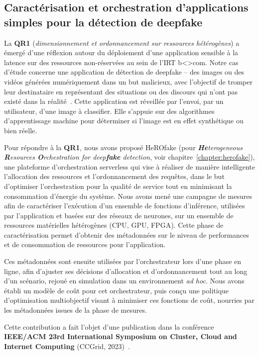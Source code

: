 \subsection{Caractérisation et orchestration d'applications simples pour la détection de deepfake}

La \textbf{QR1} (\textit{dimensionnement et ordonnancement sur ressources hétérogènes}) a émergé d'une réflexion autour du déploiement d'une application sensible à la latence sur des ressources non-réservées au sein de l'IRT b{\textless\textgreater}com. Notre cas d'étude concerne une application de détection de deepfake -- des images ou des vidéos générées numériquement dans un but malicieux, avec l'objectif de tromper leur destinataire en représentant des situations ou des discours qui n'ont pas existé dans la réalité~\cite{westerlundEmergenceDeepfakeTechnology2019}. Cette application est réveillée par l'envoi, par un utilisateur, d'une image à classifier. Elle s'appuie sur des algorithmes d'apprentissage machine pour déterminer si l'image est en effet synthétique ou bien réelle.

\sloppy Pour répondre à la \textbf{QR1}, nous avons proposé HeROfake (pour \textit{\textbf{He}terogeneous \textbf{R}esources \textbf{O}rchestration for deep\textbf{fake} detection}, voir chapitre~\ref{chapter:herofake}), une plateforme d'orchestration serverless qui vise à réaliser de manière intelligente l'allocation des ressources et l'ordonnancement des requêtes, dans le but d'optimiser l'orchestration pour la qualité de service tout en minimisant la consommation d'énergie du système. Nous avons mené une campagne de mesures afin de caractériser l'exécution d'un ensemble de fonctions d'inférence, utilisées par l'application et basées sur des réseaux de neurones, sur un ensemble de ressources matérielles hétérogènes (CPU, GPU, FPGA). Cette phase de caractérisation permet d'obtenir des métadonnées sur le niveau de performances et de consommation de ressources pour l'application.

Ces métadonnées sont ensuite utilisées par l'orchestrateur lors d'une phase en ligne, afin d'ajuster ses décisions d'allocation et d'ordonnancement tout au long d'un scénario, rejoué en simulation dans un environnement \textit{ad hoc}. Nous avons établi un modèle de coût pour cet orchestrateur, puis conçu une politique d'optimisation multiobjectif visant à minimiser ces fonctions de coût, nourries par les métadonnées issues de la phase de mesures.

Cette contribution a fait l'objet d'une publication dans la conférence \textbf{IEEE/ACM 23rd International Symposium on Cluster, Cloud and Internet Computing} (CCGrid, 2023)~\cite{herofake}.

